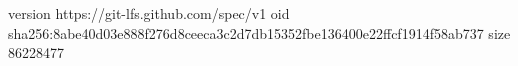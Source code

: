 version https://git-lfs.github.com/spec/v1
oid sha256:8abe40d03e888f276d8ceeca3c2d7db15352fbe136400e22ffcf1914f58ab737
size 86228477

